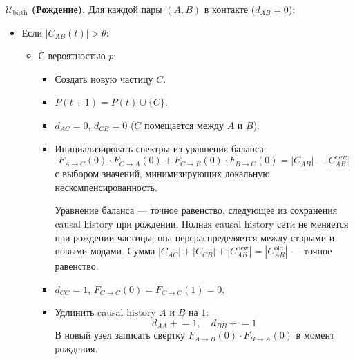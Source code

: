 \documentclass[12pt,a4paper]{article}
\begin{document}
\textbf{$\mathcal{U}_{\text{birth}}$ (Рождение).}
Для каждой пары $(A, B)$ в контакте ($d_{AB} = 0$):
\begin{itemize}
    \item Если $|C_{AB}(t)| > \theta$:
    \begin{itemize}
        \item С вероятностью $p$:
        \begin{itemize}
            \item Создать новую частицу $C$.
            \item $P(t+1) = P(t) \cup \{C\}$.
            \item $d_{AC} = 0$, $d_{CB} = 0$ ($C$ помещается между $A$ и $B$).
            \item Инициализировать спектры из уравнения баланса:
            \begin{equation}
                F_{A \to C}(0) \cdot F_{C \to A}(0) + F_{C \to B}(0) \cdot F_{B \to C}(0) = |C_{AB}| - |C_{AB}^{\text{new}}|
            \end{equation}
            с выбором значений, минимизирующих локальную нескомпенсированность.

            Уравнение баланса --- точное равенство, следующее из сохранения causal history при рождении. Полная causal history сети не меняется при рождении частицы; она перераспределяется между старыми и новыми модами. Сумма $|C_{AC}| + |C_{CB}| + |C_{AB}^{\text{new}}| = |C_{AB}^{\text{old}}|$ --- точное равенство.
            \item $d_{CC} = 1$, $F_{C \to C}(0) = F_{C \to C}(1) = 0$.
            \item Удлинить causal history $A$ и $B$ на $1$:
            \begin{equation}
                d_{AA} \mathrel{+}= 1, \quad d_{BB} \mathrel{+}= 1
            \end{equation}
            В новый узел записать свёртку $F_{A \to B}(0) \cdot F_{B \to A}(0)$ в момент рождения.
        \end{itemize}
    \end{itemize}
\end{itemize}
\end{document}
